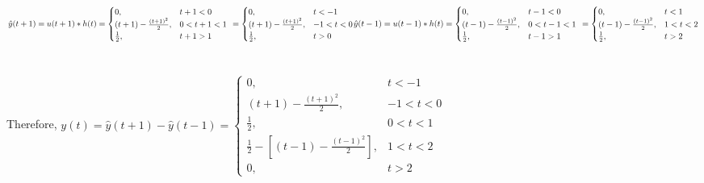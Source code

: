 \documentclass[12pt]{article}
\begin{document}
    \begin{math}
      \resizebox{.9\hsize}{!}{$
      \hat{y}(t+1) = u(t+1)*h(t) = \begin{cases}
      0,& t+1 < 0\\
      (t+1) - \frac{(t+1)^{2}}{2},& 0 < t+1 <1\\
     \frac{1}{2},& t+1 > 1
    \end{cases} \ =  \begin{cases}
      0,& t < -1\\
      (t+1) - \frac{(t+1)^{2}}{2},& -1 < t < 0\\
     \frac{1}{2},& t > 0
    \end{cases}$}  \\ \\ \\
    \resizebox{.9\hsize}{!}{$
    \hat{y}(t-1) = u(t-1)*h(t) = \begin{cases}
      0,& t-1 < 0\\
      (t-1) - \frac{(t-1)^{2}}{2},& 0 < t-1 <1\\
     \frac{1}{2},& t-1 > 1
    \end{cases} \ =  \begin{cases}
      0,& t < 1\\
      (t-1) - \frac{(t-1)^{2}}{2},& 1 < t < 2\\
     \frac{1}{2},& t > 2
    \end{cases}$} \end{math}\\ \\ \\
    Therefore, \begin{math} y(t) = \hat{y}(t+1) - \hat{y}(t-1) =  \begin{cases}
      0,& t < -1\\
      (t+1) - \frac{(t+1)^{2}}{2},& -1 < t < 0\\
     \frac{1}{2},& 0 < t < 1\\
     \frac{1}{2} - [(t-1) - \frac{(t-1)^{2}}{2}],& 1 < t < 2\\
     0,& t > 2
    \end{cases}  \end{math} \\ 
\end{document}

